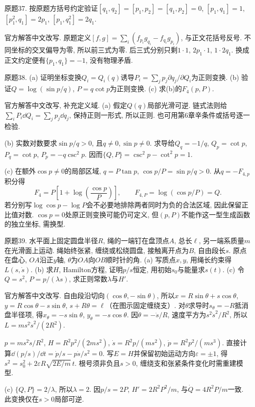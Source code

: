 \begin{exercise}
原题37. 按原题方括号约定验证$[q_1,q_2]=[p_1,p_2]=[q_1,p_2]=0$, $[p_1,q_1]=1$, $[p_1^2,q_1]=2p_1$, $[p_1,q_1^2]=2q_1$.
\end{exercise}
\begin{solution}
官方解答中文改写. 原题定义$[f,g]=\sum_i(f_{p_i}g_{q_i}-f_{q_i}g_{p_i})$, 与正文花括号反号. 不同坐标的交叉偏导为零, 所以前三式为零. 后三式分别只剩$1\cdot1$, $2p_1\cdot1$, $1\cdot2q_1$. 换成正文约定便有$\{p_1,q_1\}=-1$, 没有物理矛盾.
\end{solution}

\begin{exercise}
原题38. (a) 证明坐标变换$Q_i=Q_i(q)$诱导$P_i=\sum_jp_j\partial q_j/\partial Q_i$为正则变换. (b) 验证$Q=\log(\sin p/q)$, $P=q\cot p$为正则变换. (c) 求(b)的$F_4(p,P)$.
\end{exercise}
\begin{solution}
官方解答中文改写, 补充定义域. (a) 假定$Q(q)$局部光滑可逆. 链式法则给$\sum_iP_i\dd Q_i=\sum_jp_j\dd q_j$, 保持正则一形式, 所以正则. 也可用第6章辛条件或括号逐一检验.

(b) 实数对数要求$\sin p/q>0$, 且$q\ne0,\sin p\ne0$. 求导给$Q_q=-1/q$, $Q_p=\cot p$, $P_q=\cot p$, $P_p=-q\csc^2p$. 因而$\{Q,P\}=\csc^2p-\cot^2p=1$.

(c) 在额外$\cos p\ne0$的局部区域, $q=P\tan p$, $\cos p/P=\sin p/q>0$. 从$q=-F_{4,p}$积分得
\[
F_4=P\left[1+\log\left(\frac{\cos p}{P}\right)\right],
\qquad F_{4,P}=\log(\cos p/P)=Q.
\]
若分别写$\log\cos p-\log P$会不必要地排除两者同时为负的合法区域, 因此保留正比值对数. $\cos p=0$处原正则变换可能仍可定义, 但$(p,P)$不能作这一型生成函数的独立坐标, 需换型.
\end{solution}

\begin{exercise}
原题39. 水平面上固定圆盘半径$R$, 绳的一端钉在盘顶点$A$, 总长$\ell$, 另一端系质量$m$在光滑面上运动. 绳始终张紧, 缠绕或松绕圆盘, 接触离开点为$B$, 自由段长$s$. 原点在盘心, $OA$沿正$y$轴, $\theta$为$OA$向$OB$顺时针的角. (a) 写质点$x,y$, 用绳长约束得$L(s,\dot s)$. (b) 求$H$, Hamilton方程, 证明$p/s$恒定, 用初始$s_0$与能量求$s(t)$. (c) 令$Q=s^2$, $P=p/(\lambda s)$, 求正则常数$\lambda$与$H'$.
\end{exercise}
\begin{solution}
官方解答中文改写. 自由段沿切向$(\cos\theta,-\sin\theta)$, 所以$x=R\sin\theta+s\cos\theta$, $y=R\cos\theta-s\sin\theta$, $s+R\theta=\ell$（在图示固定缠绕支）. 对$\theta$求导时$s_\theta=-R$抵消盘半径项, 得$x_\theta=-s\sin\theta$, $y_\theta=-s\cos\theta$. 因$\dot\theta=-\dot s/R$, 速度平方为$s^2\dot s^2/R^2$, 所以$L=ms^2\dot s^2/(2R^2)$.

$p=ms^2\dot s/R^2$, $H=R^2p^2/(2ms^2)$, $\dot s=R^2p/(ms^2)$, $\dot p=R^2p^2/(ms^3)$. 直接计算$\dd(p/s)/\dd t=\dot p/s-p\dot s/s^2=0$. 写$E=H$并保留初始运动方向$\varepsilon=\pm1$, 得$s^2=s_0^2+2\varepsilon R\sqrt{2E/m}\,t$. 根号须非负且$s>0$, 缠绕支和张紧条件变化时需重建模型.

(c) $\{Q,P\}=2/\lambda$, 所以$\lambda=2$. 因$p/s=2P$, $H'=2R^2P^2/m$, 与$\dot Q=4R^2P/m$一致. 此变换仅在$s>0$局部可逆.
\end{solution}

